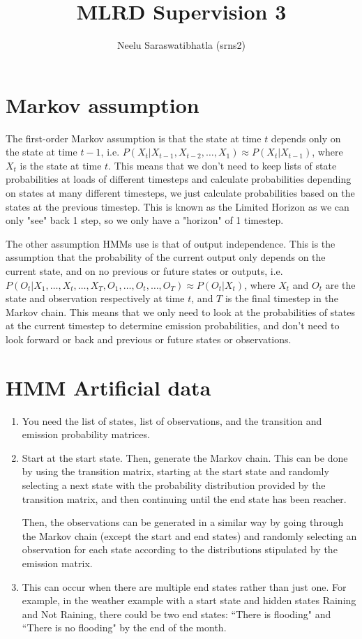 \documentclass[12pt]{article}
\author{Neelu Saraswatibhatla (srns2)}
\title{MLRD Supervision 3}
\date{\vspace{-5ex}}
\begin{document}
\maketitle

\section*{Markov assumption}

The first-order Markov assumption is that the state at time $t$ depends only on the state at time $t-1$, i.e. $P(X_t | X_{t-1}, X_{t-2}, \ldots, X_1) \approx P(X_t | X_{t-1})$, where $X_t$ is the state at time $t$.
This means that we don't need to keep lists of state probabilities at loads of different timesteps and calculate probabilities depending on states at many different timesteps, we just calculate probabilities based on the states at the previous timestep.
This is known as the Limited Horizon as we can only "see" back 1 step, so we only have a "horizon" of 1 timestep.

The other assumption HMMs use is that of output independence. This is the assumption that the probability of the current output only depends on the current state, and on no previous or future states or outputs, i.e. $P(O_t | X_1, \ldots, X_t, \ldots, X_T, O_1, \ldots, O_t, \ldots, O_T) \approx P(O_t | X_t)$, where $X_t$ and $O_t$ are the state and observation respectively at time $t$, and $T$ is the final timestep in the Markov chain.
This means that we only need to look at the probabilities of states at the current timestep to determine emission probabilities, and don't need to look forward or back and previous or future states or observations.

\section*{HMM Artificial data}
\begin{enumerate}
    \item You need the list of states, list of observations, and the transition and emission probability matrices.
    \item Start at the start state. Then, generate the Markov chain. This can be done by using the transition matrix, starting at the start state and randomly selecting a next state with the probability distribution provided by the transition matrix, and then continuing until the end state has been reacher.

    Then, the observations can be generated in a similar way by going through the Markov chain (except the start and end states) and randomly selecting an observation for each state according to the distributions stipulated by the emission matrix.
    
    \item This can occur when there are multiple end states rather than just one. For example, in the weather example with a start state and hidden states Raining and Not Raining, there could be two end states: ``There is flooding" and ``There is no flooding" by the end of the month.
\end{enumerate}
\end{document}

